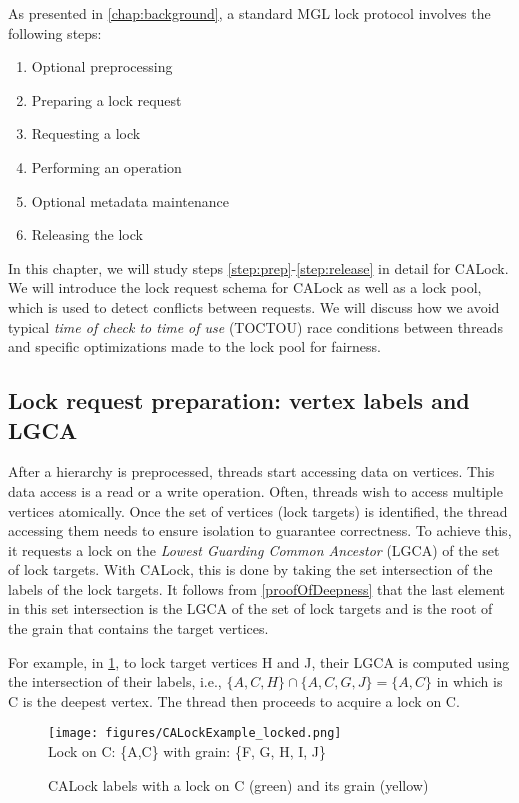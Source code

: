 As presented in \cref{chap:background}, a standard MGL lock protocol involves the following steps:

\begin{enumerate}
	\item Optional preprocessing
	\item Preparing a lock request \label{step:prep}
	\item Requesting a lock
	\item Performing an operation
	\item Optional metadata maintenance
	\item Releasing the lock \label{step:release}
\end{enumerate}

In this chapter, we will study steps \ref{step:prep}-\ref{step:release} in detail for CALock. We will introduce the lock request schema for CALock as well as a lock pool, which is used to detect conflicts between requests. We will discuss how we avoid typical \emph{time of check to time of use} (TOCTOU) race conditions between threads and specific optimizations made to the lock pool for fairness.


\subsection{Lock request preparation: vertex labels and LGCA}

After a hierarchy is preprocessed, threads start accessing data on vertices. This data access is a read or a write operation. Often, threads wish to access multiple vertices atomically. Once the set of vertices (lock targets) is identified, the thread accessing them needs to ensure isolation to guarantee correctness. To achieve this, it requests a lock on the \emph{Lowest Guarding Common Ancestor} (LGCA) of the set of lock targets. With CALock, this is done by taking the set intersection of the labels of the lock targets. It follows from \cref{proofOfDeepness} that the last element in this set intersection is the LGCA of the set of lock targets and is the root of the grain that contains the target vertices. 

For example, in \cref{calockexample}, to lock target vertices H and J, their LGCA is computed using the intersection of their labels, i.e., $\{A, C, H\} \cap \{A, C, G, J\} =  \{A,C\}$ in which is C is the deepest vertex. The thread then proceeds to acquire a lock on C. 


\begin{figure}[h]
	\centering
	\captionsetup{justification=centering}
	\texttt{[image: figures/CALockExample\_locked.png]}\\
	{\small
		Lock on C: \{A,C\} with grain: \{F, G, H, I, J\}
	}
	\caption{CALock labels with a lock on C (green) and its grain (yellow)}
	\label{calockexample}
\end{figure}

